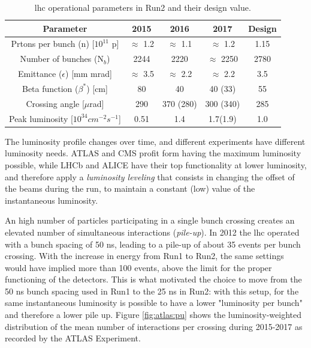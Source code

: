 \begin{table}[ht]
\begin{center}
\begin{tabular}{c c c c c }
\hline 
Parameter & 2015 & 2016 & 2017 & Design \\ 
\hline 
\hline
Prtons per bunch (n) [$10^{11}$ p] & $\approx$ 1.2 & $\approx$ 1.1 & $\approx$ 1.2 & 1.15 \\ 
\hline 
Number of bunches (N$_b$) & 2244 & 2220 & $\approx$ 2250 & 2780 \\ 
\hline 
Emittance ($\epsilon$) [mm mrad] & $\approx$ 3.5 & $\approx$ 2.2 & $\approx$ 2.2 & 3.5 \\ 
\hline 
Beta function ($\beta^*$) [cm] & 80 & 40 & 40 (33) & 55 \\
\hline
Crossing angle [$\mu$rad] & 290 & 370 (280) & 300 (340) & 285 \\
\hline
Peak luminosity [$10^{34} cm^{-2}s^{-1}$] & 0.51 & 1.4 & 1.7(1.9) & 1.0 \\
\hline
\end{tabular}
\end{center}
\caption{\gls{lhc} operational parameters in Run2 and their design value.}
\label{tab:lhc:param}
\end{table}


The luminosity profile changes over time, and different experiments have different luminosity needs. ATLAS and CMS profit form having the maximum luminosity possible, while LHCb and ALICE have their top functionality at lower luminosity, and therefore apply a \textit{luminosity leveling} that consists in changing the offset of the beams during the run, to maintain a constant (low) value of the instantaneous luminosity.

An high number of particles participating in a single bunch crossing creates an elevated number of simultaneous interactions (\textit{pile-up}). In 2012 the \gls{lhc} operated with a bunch spacing of 50 ns, leading to a pile-up of about 35 events per bunch crossing. With the increase in energy from Run1 to Run2, the same settings would have implied more than 100 events, above the limit for the proper functioning of the detectors. This is what motivated the choice to move from the 50 ns bunch spacing used in Run1 to the 25 ns in Run2: with this setup, for the same instantaneous luminosity is possible to have a lower "luminosity per bunch" and therefore a lower pile up. Figure \ref{fig:atlas:pu} shows the luminosity-weighted distribution of the mean number of interactions per crossing during 2015-2017 as recorded by the ATLAS Experiment.

